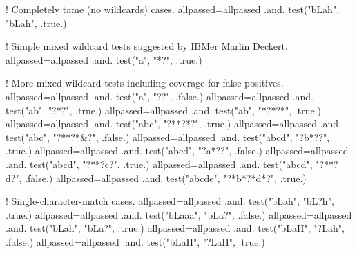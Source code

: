 \begin{DoxyVerb}
  ! Completely tame (no wildcards) cases.
  allpassed=allpassed .and. test("bLah", "bLah", .true.)

  ! Simple mixed wildcard tests suggested by IBMer Marlin Deckert.
  allpassed=allpassed .and. test("a", "*?", .true.)

  ! More mixed wildcard tests including coverage for false positives.
  allpassed=allpassed .and. test("a", "??", .false.)
  allpassed=allpassed .and. test("ab", "?*?", .true.)
  allpassed=allpassed .and. test("ab", "*?*?*", .true.)
  allpassed=allpassed .and. test("abc", "?**?*?", .true.)
  allpassed=allpassed .and. test("abc", "?**?*&?", .false.)
  allpassed=allpassed .and. test("abcd", "?b*??", .true.)
  allpassed=allpassed .and. test("abcd", "?a*??", .false.)
  allpassed=allpassed .and. test("abcd", "?**?c?", .true.)
  allpassed=allpassed .and. test("abcd", "?**?d?", .false.)
  allpassed=allpassed .and. test("abcde", "?*b*?*d*?", .true.)

  ! Single-character-match cases.
  allpassed=allpassed .and. test("bLah", "bL?h", .true.)
  allpassed=allpassed .and. test("bLaaa", "bLa?", .false.)
  allpassed=allpassed .and. test("bLah", "bLa?", .true.)
  allpassed=allpassed .and. test("bLaH", "?Lah", .false.)
  allpassed=allpassed .and. test("bLaH", "?LaH", .true.)


\end{DoxyVerb}
